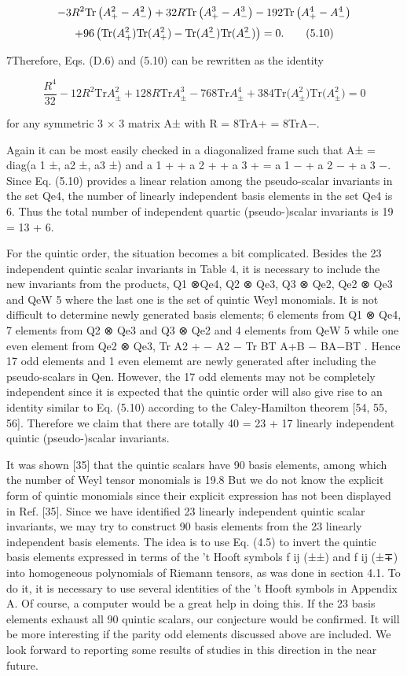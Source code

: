 \documentclass{article}
\begin{document}
$$-3R^{2}{\rm Tr}\left(A_{+}^{2}-A_{-}^{2}\right)+32R{\rm Tr}\left(A_{+}^{3}-A_{-}^{3}\right)-192{\rm Tr}\left(A_{+}^{4}-A_{-}^{4}\right)$$ $$+96\left({\rm Tr}(A_{+}^{2}){\rm Tr}(A_{+}^{2})-{\rm Tr}(A_{-}^{2}){\rm Tr}(A_{-}^{2})\right)=0.\tag{5.10}$$

7Therefore, Eqs. (D.6) and (5.10) can be rewritten as the identity

$$\frac{R^{4}}{32}-12R^{2}\mathrm{Tr}A_{\pm}^{2}+128R\mathrm{Tr}A_{\pm}^{3}-768\mathrm{Tr}A_{\pm}^{4}+384\mathrm{Tr}\big(A_{\pm}^{2}\big)\mathrm{Tr}\big(A_{\pm}^{2}\big)=0$$

for any symmetric 3 × 3 matrix A± with R = 8TrA+ = 8TrA−.

Again it can be most easily checked in a diagonalized frame such that A± = diag(a 1 ±, a2 ±, a3 ±) and a 1 + + a 2 + + a 3 + = a 1 − + a 2 − + a 3 −. Since Eq. (5.10) provides a linear relation among the pseudo-scalar invariants in the set Qe4, the number of linearly independent basis elements in the set Qe4 is 6. Thus the total number of independent quartic (pseudo-)scalar invariants is 19 = 13 + 6.

For the quintic order, the situation becomes a bit complicated. Besides the 23 independent quintic scalar invariants in Table 4, it is necessary to include the new invariants from the products, Q1 ⊗Qe4, Q2 ⊗ Qe3, Q3 ⊗ Qe2, Qe2 ⊗ Qe3 and QeW 5 where the last one is the set of quintic Weyl monomials. It is not difficult to determine newly generated basis elements; 6 elements from Q1 ⊗ Qe4, 7 elements from Q2 ⊗ Qe3 and Q3 ⊗ Qe2 and 4 elements from QeW 5 while one even element from Qe2 ⊗ Qe3, Tr A2 + − A2 − Tr BT A+B − BA−BT . Hence 17 odd elements and 1 even elememt are newly generated after including the pseudo-scalars in Qen. However, the 17 odd elements may not be completely independent since it is expected that the quintic order will also give rise to an identity similar to Eq. (5.10) according to the Caley-Hamilton theorem [54, 55, 56]. Therefore we claim that there are totally 40 = 23 + 17 linearly independent quintic (pseudo-)scalar invariants.

It was shown [35] that the quintic scalars have 90 basis elements, among which the number of Weyl tensor monomials is 19.8 But we do not know the explicit form of quintic monomials since their explicit expression has not been displayed in Ref. [35]. Since we have identified 23 linearly independent quintic scalar invariants, we may try to construct 90 basis elements from the 23 linearly independent basis elements. The idea is to use Eq. (4.5) to invert the quintic basis elements expressed in terms of the 't Hooft symbols f ij (±±) and f ij (±∓) into homogeneous polynomials of Riemann tensors, as was done in section 4.1. To do it, it is necessary to use several identities of the 't Hooft symbols in Appendix A. Of course, a computer would be a great help in doing this. If the 23 basis elements exhaust all 90 quintic scalars, our conjecture would be confirmed. It will be more interesting if the parity odd elements discussed above are included. We look forward to reporting some results of studies in this direction in the near future.
\end{document}
